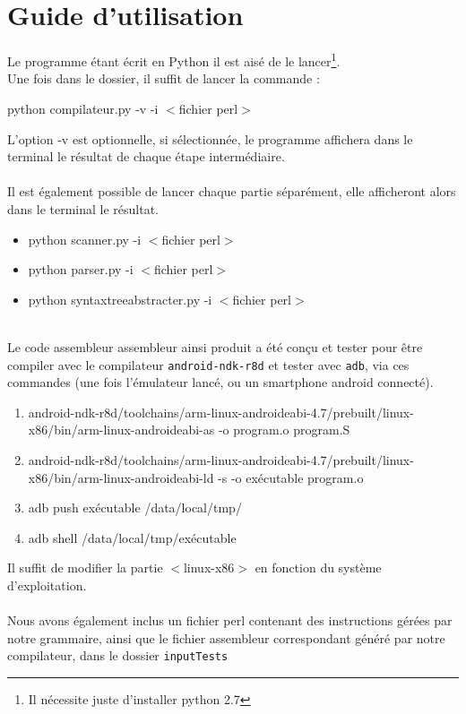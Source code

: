 \documentclass[a4paper,10pt]{article}
\begin{document}
\section{Guide d'utilisation}

Le programme étant écrit en Python il est aisé de le lancer\footnote{Il nécessite juste d'installer python 2.7}.\\
Une fois dans le dossier, il suffit de lancer la commande :
\begin{center}
	python compilateur.py -v -i  $<$fichier perl$>$
\end{center}
L'option -v est optionnelle, si sélectionnée, le programme affichera dans le terminal le résultat de chaque étape intermédiaire.\\
~\\
Il est également possible de lancer chaque partie séparément, elle afficheront alors dans le terminal le résultat.
\begin{itemize}
	\item python scanner.py -i $<$fichier perl$>$ 
	\item python parser.py -i $<$fichier perl$>$ 
	\item python syntaxtreeabstracter.py -i $<$fichier perl$>$ 
\end{itemize}
~\\
Le code assembleur assembleur ainsi produit a été conçu et tester pour être compiler avec le compilateur \verb?android-ndk-r8d? et tester avec \verb?adb?, via ces commandes (une fois l'émulateur lancé, ou un smartphone android connecté).
\begin{enumerate}
\item	android-ndk-r8d/toolchains/arm-linux-androideabi-4.7/prebuilt/linux-x86/bin/arm-linux-androideabi-as -o program.o program.S
\item	android-ndk-r8d/toolchains/arm-linux-androideabi-4.7/prebuilt/linux-x86/bin/arm-linux-androideabi-ld -s -o exécutable program.o
\item	adb push exécutable /data/local/tmp/
\item	adb shell /data/local/tmp/exécutable
\end{enumerate}
Il suffit de modifier la partie $<$linux-x86$>$ en fonction du système d'exploitation.\\
~\\
Nous avons également inclus un fichier perl contenant des instructions gérées par notre grammaire, ainsi que le fichier assembleur correspondant généré par notre compilateur, dans le dossier \verb?inputTests?
\end{document}
